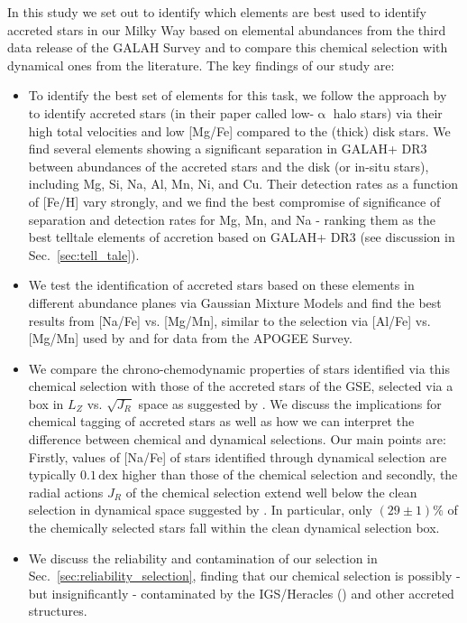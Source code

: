 \documentclass[fleqn,usenatbib]{mnras}
\newcommand{\dex}{\,\mathrm{dex}}	%
\begin{document}
In this study we set out to identify which elements are best used to identify accreted stars in our Milky Way based on elemental abundances from the third data release of the GALAH Survey \citep{Buder2021} and to compare this chemical selection with dynamical ones from the literature. The key findings of our study are:
\begin{itemize}
\item To identify the best set of elements for this task, we follow the approach by \citet{Nissen2010} to identify accreted stars (in their paper called low-$\upalpha$ halo stars) via their high total velocities and low [Mg/Fe] compared to the (thick) disk stars. We find several elements showing a significant separation in GALAH+ DR3 between abundances of the accreted stars and the disk (or in-situ stars), including Mg, Si, Na, Al, Mn, Ni, and Cu. Their detection rates as a function of [Fe/H] vary strongly, and we find the best compromise of significance of separation and detection rates for Mg, Mn, and Na - ranking them as the best telltale elements of accretion based on GALAH+ DR3 (see discussion in Sec.~\ref{sec:tell_tale}).
\item We test the identification of accreted stars based on these elements in different abundance planes via Gaussian Mixture Models and find the best results from [Na/Fe] vs. [Mg/Mn], similar to the selection via [Al/Fe] vs. [Mg/Mn] used by \citet{Hawkins2015} and \citet{Das2020} for data from the APOGEE Survey. 
\item We compare the chrono-chemodynamic properties of stars identified via this chemical selection with those of the accreted stars of the GSE, selected via a box in $L_Z$ vs. $\sqrt{J_R}$ space as suggested by \citet{Feuillet2021}. We discuss the implications for chemical tagging of accreted stars as well as how we can interpret the difference between chemical and dynamical selections. Our main points are: Firstly, values of [Na/Fe] of stars identified through dynamical  selection are typically $0.1\dex$ higher than those of the chemical selection and secondly, the radial actions $J_R$ of the chemical selection extend well below the clean selection in dynamical space suggested by \citet{Feuillet2021}. In particular, only $(29\pm1)\%$ of the chemically selected stars fall within the clean dynamical selection box. \item We discuss the reliability and contamination of our selection in Sec.~\ref{sec:reliability_selection}, finding that our chemical selection is possibly - but insignificantly - contaminated by the IGS/Heracles () and other accreted structures.

\end{itemize}
\end{document}
